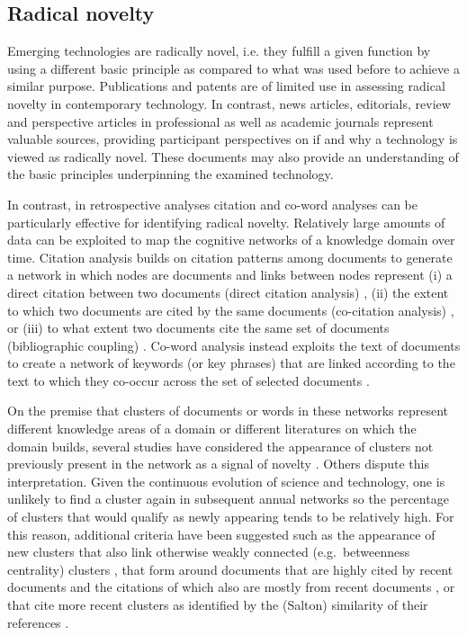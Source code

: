 \documentclass[11pt]{article}
\begin{document}
\subsection{Radical novelty}
Emerging technologies are radically novel, i.e. they fulfill a given function by using a different basic principle as compared to what was used before to achieve a similar purpose. Publications and patents are of limited use in assessing radical novelty in contemporary technology. In contrast, news articles, editorials, review and perspective articles in professional as well as academic journals represent valuable sources, providing participant perspectives on if and why a technology is viewed as radically novel. These documents may also provide an understanding of the basic principles underpinning the examined technology. 

In contrast, in retrospective analyses citation and co-word analyses can be particularly effective for identifying radical novelty. Relatively large amounts of data can be exploited to map the cognitive networks of a knowledge domain over time. Citation analysis builds on citation patterns among documents to generate a network in which nodes are documents and links between nodes represent (i) a direct citation between two documents (direct citation analysis) \citep{Garfield1964}, (ii) the extent to which two documents are cited by the same documents (co-citation analysis) \citep{Small1973}, or (iii) to what extent two documents cite the same set of documents (bibliographic coupling) \citep{Kessler1963}. Co-word analysis instead exploits the text of documents to create a network of keywords (or key phrases) that are linked according to the text to which they co-occur across the set of selected documents \citep{Callon1983}. 

On the premise that clusters of documents or words in these networks represent different knowledge areas of a domain or different literatures on which the domain builds, several studies have considered the appearance of clusters not previously present in the network as a signal of novelty \citep[e.g.][]{Erdi2012,Kajikawa2008}. Others dispute this interpretation. Given the continuous evolution of science and technology, one is unlikely to find a cluster again in subsequent annual networks so the percentage of clusters that would qualify as newly appearing tends to be relatively high. For this reason, additional criteria have been suggested such as the appearance of new clusters that also link otherwise weakly connected (e.g.\ betweenness centrality) clusters \citep[e.g.][]{Shibata2011,Furukawa2015}, that form around documents that are highly cited by recent documents and the citations of which also are mostly from recent documents \citep{Breitzman2015}, or that cite more recent clusters as identified by the (Salton) similarity of their references \citep{Morris2003}.
\end{document}
